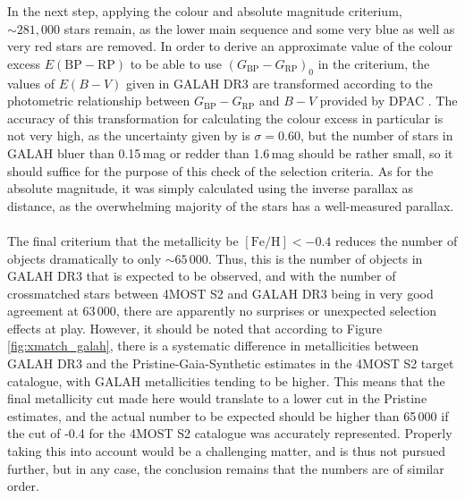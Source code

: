 \documentclass[a4paper,11pt]{article}
\begin{document}
In the next step, applying the colour and absolute magnitude criterium, ${\sim}281,000$ stars remain, as the lower main sequence and some very blue as well as very red stars are removed. In order to derive an approximate value of the colour excess $E\mathrm{(BP-RP)}$ to be able to use $(G_\mathrm{BP}-G_\mathrm{RP})_0$ in the criterium, the values of $E(B-V)$ given in GALAH DR3 are transformed according to the photometric relationship between $G_\mathrm{BP}-G_\mathrm{RP}$ and $B-V$ provided by DPAC \citep{photrel}. The accuracy of this transformation for calculating the colour excess in particular is not very high, as the uncertainty given by \citet{photrel} is $\sigma=0.60$, but the number of stars in GALAH bluer than 0.15\,mag or redder than 1.6\,mag should be rather small, so it should suffice for the purpose of this check of the selection criteria. As for the absolute magnitude, it was simply calculated using the inverse parallax as distance, as the overwhelming majority of the stars has a well-measured parallax.\\ \\
%
The final criterium that the metallicity be $\mathrm{[Fe/H]}<-0.4$ reduces the number of objects dramatically to only ${\sim}65\,000$. Thus, this is the number of objects in GALAH DR3 that is expected to be observed, and with the number of crossmatched stars between 4MOST S2 and GALAH DR3 being in very good agreement at 63\,000, there are apparently no surprises or unexpected selection effects at play. However, it should be noted that according to Figure \ref{fig:xmatch_galah}, there is a systematic difference in metallicities between GALAH DR3 and the Pristine-Gaia-Synthetic estimates in the 4MOST S2 target catalogue, with GALAH metallicities tending to be higher. This means that the final metallicity cut made here would translate to a lower cut in the Pristine estimates, and the actual number to be expected should be higher than 65\,000 if the cut of -0.4 for the 4MOST S2 catalogue was accurately represented. Properly taking this into account would be a challenging matter, and is thus not pursued further, but in any case, the conclusion remains that the numbers are of similar order.\\ \\
%
\end{document}
